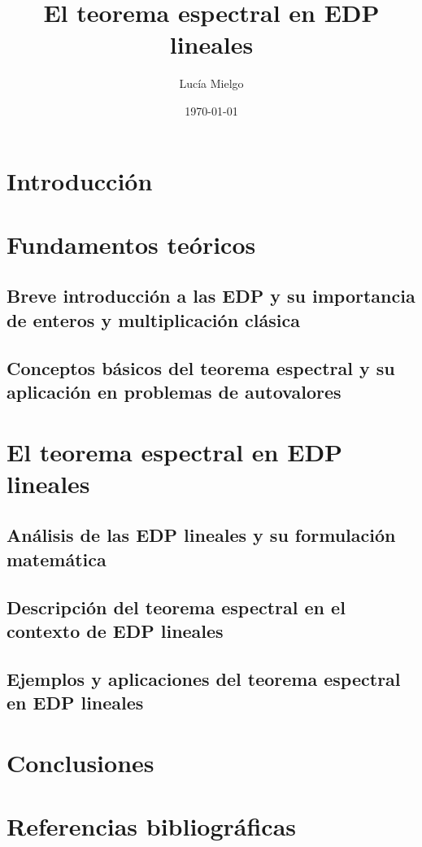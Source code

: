 \documentclass{article}
\title{El teorema espectral en EDP lineales}
\author{Lucía Mielgo}
\date{\today}
\begin{document}
\maketitle %
\newpage

\renewcommand{\contentsname}{Índice} 
\tableofcontents

\section{Introducción}
    
\section{Fundamentos teóricos}
    \subsection{Breve introducción a las EDP y su importancia de enteros y multiplicación clásica}
    \subsection{Conceptos básicos del teorema espectral y su aplicación en problemas de autovalores}
    
\section{El teorema espectral en EDP lineales}
    \subsection{Análisis de las EDP lineales y su formulación matemática}
    \subsection{Descripción del teorema espectral en el contexto de EDP lineales}
    \subsection{Ejemplos y aplicaciones del teorema espectral en EDP lineales}
    
\section{Conclusiones}
\section{Referencias bibliográficas}
\end{document}
